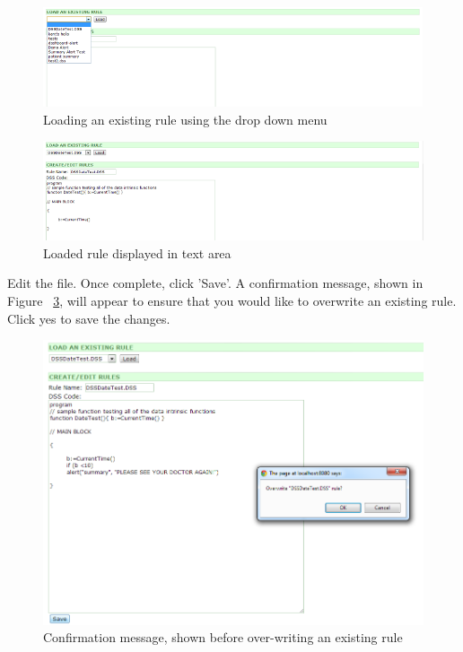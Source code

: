 \documentclass[12pt,letterpaper]{article}
\begin{document}
\begin{figure}[htbp]
\begin{center}
\includegraphics[width=6.5in]{user_guide/load_rule.png}
\end{center}
\caption{Loading an existing rule using the drop down menu}
\label{fig:LOAD_RULE}
\end{figure}

\begin{figure}[htbp]
\begin{center}
\includegraphics[width=6.5in]{user_guide/load_rule_shown.png}
\end{center}
\caption{Loaded rule displayed in text area}
\label{fig:LOAD_RULE_SHOWN}
\end{figure}

Edit the file. Once complete, click 'Save'. A confirmation message, shown in Figure ~\ref{fig:MODIFY_CONFIRMATION}, will appear to ensure that you would like to overwrite an existing rule. Click yes to save the changes.


\begin{figure}[htbp]
\begin{center}
\includegraphics[width=6.5in]{user_guide/modify_confirmation.png}
\end{center}
\caption{Confirmation message, shown before over-writing an existing rule}
\label{fig:MODIFY_CONFIRMATION}
\end{figure}
\end{document}
